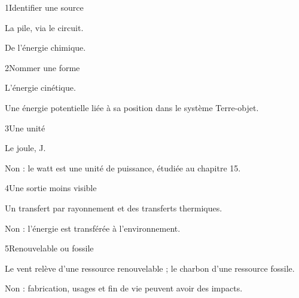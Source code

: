 \par\noindent\begin{minipage}{\linewidth}
\begin{corrige}{1}{Identifier une source}
\begin{questions}
\item La pile, via le circuit.
\item De l’énergie chimique.
\end{questions}
\end{corrige}
\end{minipage}
\par\noindent\begin{minipage}{\linewidth}
\begin{corrige}{2}{Nommer une forme}
\begin{questions}
\item L’énergie cinétique.
\item Une énergie potentielle liée à sa position dans le système Terre-objet.
\end{questions}
\end{corrige}
\end{minipage}
\par\noindent\begin{minipage}{\linewidth}
\begin{corrige}{3}{Une unité}
\begin{questions}
\item Le joule, J.
\item Non : le watt est une unité de puissance, étudiée au chapitre 15.
\end{questions}
\end{corrige}
\end{minipage}
\par\noindent\begin{minipage}{\linewidth}
\begin{corrige}{4}{Une sortie moins visible}
\begin{questions}
\item Un transfert par rayonnement et des transferts thermiques.
\item Non : l’énergie est transférée à l’environnement.
\end{questions}
\end{corrige}
\end{minipage}
\par\noindent\begin{minipage}{\linewidth}
\begin{corrige}{5}{Renouvelable ou fossile}
\begin{questions}
\item Le vent relève d’une ressource renouvelable ; le charbon d’une ressource fossile.
\item Non : fabrication, usages et fin de vie peuvent avoir des impacts.
\end{questions}
\end{corrige}
\end{minipage}
